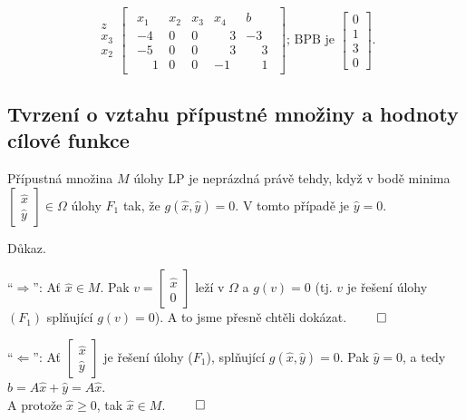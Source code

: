 \begin{equation*}
    \begin{array}{c}
        \\
        z \\
        x_3 \\
        x_2 \\
    \end{array}
    \begin{bmatrix}
        \begin{array}{cccc|c}
            x_1 & x_2 & x_3 & x_4 & b \\ \hline
            -4 & 0 & 0 & \phantom{-}3 & -3 \\ \hline
            -5 & 0 & 0 & \phantom{-}3 & \phantom{-}3  \\
            \phantom{-}1 & 0 & 0 & -1 & \phantom{-}1
        \end{array}
    \end{bmatrix}
    \text{; BPB je }
    \begin{bmatrix}
        0 \\
        1 \\
        3 \\
        0
    \end{bmatrix}.
\end{equation*}

\subsection{Tvrzení o vztahu přípustné množiny a hodnoty cílové funkce}
Přípustná množina $M$ úlohy LP je neprázdná právě tehdy, když v bodě minima 
$\begin{bmatrix} \hat x \\ \hat y \end{bmatrix} \in \Omega$ úlohy $F_1$ tak, že $g(\hat x, \hat y) = 0$.
V tomto případě je $\hat y = 0$.

Důkaz.

\enquote{$\Rightarrow$}: Ať $\hat x \in M$. Pak $v = \begin{bmatrix} \hat x \\ 0 \end{bmatrix}$ leží v $\Omega$ a 
$g(v) = 0$ (tj. $v$ je řešení úlohy $(F_1)$ splňující $g(v) = 0$). A to jsme přesně chtěli dokázat. $\qed$

\enquote{$\Leftarrow$}: Ať $\begin{bmatrix} \hat x \\ \hat y \end{bmatrix}$ je řešení úlohy ($F_1$), splňující 
$g(\hat x, \hat y) = 0$. Pak $\hat y = 0$, a tedy $b = A \hat x + \hat y = A \hat x$. \\ A protože $\hat x \geq 0$, tak 
$\hat x \in M$. $\qed$

